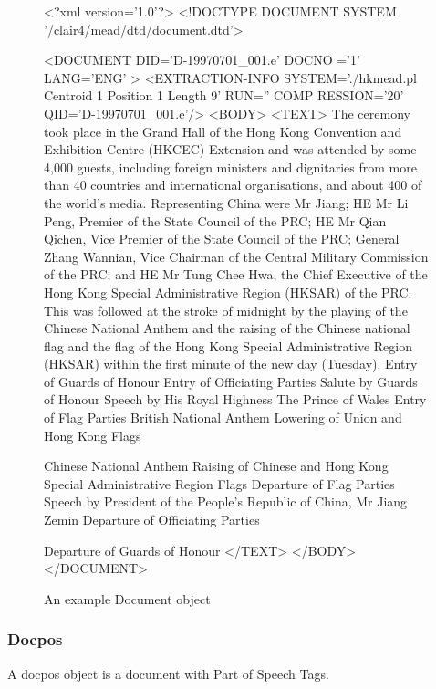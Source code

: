\documentclass[10pt]{article}
\begin{document}
\begin{figure}[htp!]
\centering
\scriptsize
\begin{boxedverbatim}
<?xml version='1.0'?>
<!DOCTYPE DOCUMENT SYSTEM '/clair4/mead/dtd/document.dtd'>

<DOCUMENT DID='D-19970701_001.e' DOCNO ='1' LANG='ENG' >
<EXTRACTION-INFO SYSTEM='./hkmead.pl Centroid 1 Position 1
Length 9' RUN='' COMP
RESSION='20' QID='D-19970701_001.e'/>
<BODY>
<TEXT>
The ceremony took place in the Grand Hall of the Hong Kong Convention
and Exhibition Centre (HKCEC) Extension and was attended by some 4,000
guests, including foreign ministers and dignitaries from more than 40
countries and international organisations, and about 400 of the
world's media. Representing China were Mr Jiang; HE Mr Li Peng,
Premier of the State Council of the PRC; HE Mr Qian Qichen, Vice
Premier of the State Council of the PRC; General Zhang Wannian, Vice
Chairman of the Central Military Commission of the PRC; and HE Mr Tung
Chee Hwa, the Chief Executive of the Hong Kong Special Administrative
Region (HKSAR) of the PRC.  This was followed at the stroke of
midnight by the playing of the Chinese National Anthem and the raising
of the Chinese national flag and the flag of the Hong Kong Special
Administrative Region (HKSAR) within the first minute of the new day
(Tuesday).  Entry of Guards of Honour Entry of Officiating Parties
Salute by Guards of Honour Speech by His Royal Highness The Prince of
Wales Entry of Flag Parties British National Anthem Lowering of Union
and Hong Kong Flags

Chinese National Anthem Raising of Chinese and Hong Kong Special
Administrative Region Flags Departure of Flag Parties Speech by
President of the People's Republic of China, Mr Jiang Zemin Departure
of Officiating Parties

Departure of Guards of Honour
</TEXT>
</BODY>
</DOCUMENT>
\end{boxedverbatim}
\caption{An example Document object}
\end{figure}


\subsubsection{Docpos}

A docpos object is a document with Part of Speech Tags.
\end{document}
